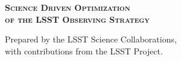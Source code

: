 \documentclass[11pt,headsepline,cleardoubleempty,twoside,openright]{scrbook}
\begin{document}
\begin{titlepage}
\begin{center}


{\Huge\bfseries\scshape
 Science Driven Optimization \\ \vspace{\baselineskip}
 of the LSST Observing Strategy}



% 

%
%


{\Large  Prepared by the LSST Science Collaborations,}\\
{\Large with contributions from the LSST Project. }\\

\end{center}
\end{titlepage}


\clearemptydoublepage



\tableofcontents
\label{toc}


\clearemptydoublepage









\end{document}
